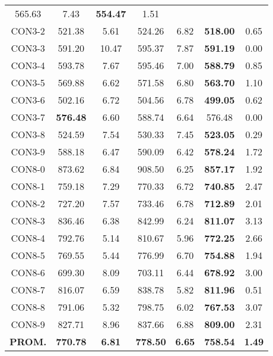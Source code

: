 \begin{table}[ht]
\begin{tabular}{c c c c c c c}
565.63 & 7.43 & \bf{554.47} & 
1.51\\CON3-2 & 521.38 & 5.61 & 
524.26 & 6.82 & \bf{518.00} & 
0.65\\CON3-3 & 591.20 & 10.47 & 
595.37 & 7.87 & \bf{591.19} & 
0.00\\CON3-4 & 593.78 & 7.67 & 
595.46 & 7.00 & \bf{588.79} & 
0.85\\CON3-5 & 569.88 & 6.62 & 
571.58 & 6.80 & \bf{563.70} & 
1.10\\CON3-6 & 502.16 & 6.72 & 
504.56 & 6.78 & \bf{499.05} & 
0.62\\CON3-7 & \bf{576.48} & 6.60 & 
588.74 & 6.64 & 576.48 & 0.00\\
CON3-8 & 524.59 & 7.54 & 
530.33 & 7.45 & \bf{523.05} & 
0.29\\CON3-9 & 588.18 & 6.47 & 
590.09 & 6.42 & \bf{578.24} & 
1.72\\CON8-0 & 873.62 & 6.84 & 
908.50 & 6.25 & \bf{857.17} & 
1.92\\CON8-1 & 759.18 & 7.29 & 
770.33 & 6.72 & \bf{740.85} & 
2.47\\CON8-2 & 727.20 & 7.57 & 
733.46 & 6.78 & \bf{712.89} & 
2.01\\CON8-3 & 836.46 & 6.38 & 
842.99 & 6.24 & \bf{811.07} & 
3.13\\CON8-4 & 792.76 & 5.14 & 
810.67 & 5.96 & \bf{772.25} & 
2.66\\CON8-5 & 769.55 & 5.44 & 
776.99 & 6.70 & \bf{754.88} & 
1.94\\CON8-6 & 699.30 & 8.09 & 
703.11 & 6.44 & \bf{678.92} & 
3.00\\CON8-7 & 816.07 & 6.59 & 
838.78 & 5.82 & \bf{811.96} & 
0.51\\CON8-8 & 791.06 & 5.32 & 
798.75 & 6.02 & \bf{767.53} & 
3.07\\CON8-9 & 827.71 & 8.96 & 
837.66 & 6.88 & \bf{809.00} & 
2.31\\\bf{PROM.} & 
\bf{770.78} & \bf{6.81} & \bf{778.50} & \bf{6.65} & \bf{758.54} & \bf{1.49}\\[1ex]\hline
\end{tabular}
\label{table:nonlin}
\end{table} \clearpage
